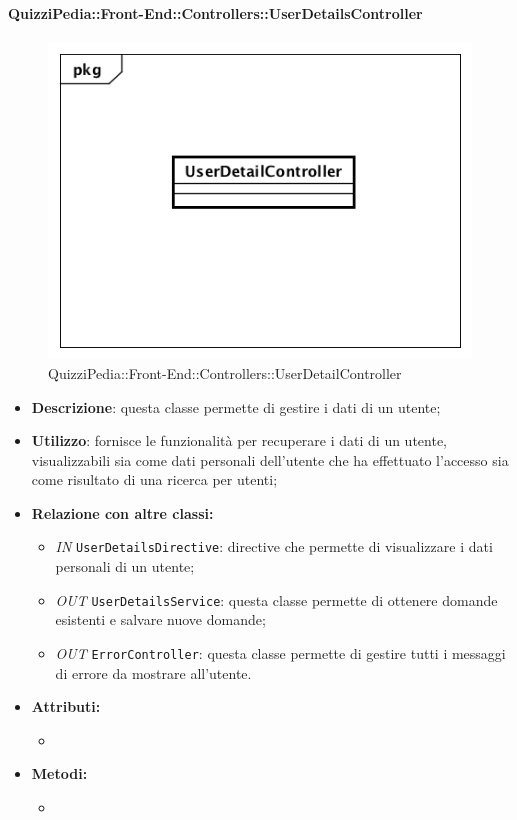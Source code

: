 \paragraph{QuizziPedia::Front-End::Controllers::UserDetailsController}
\begin{figure}
	\centering
	\includegraphics[scale=0.45]{UML/Classi/Front-End/QuizziPedia_Front-end_Controller_UserDetailController.png}
	\caption{QuizziPedia::Front-End::Controllers::UserDetailController}
\end{figure}
\begin{itemize}
	\item \textbf{Descrizione}: questa classe permette di gestire i dati di un utente;
	\item \textbf{Utilizzo}: fornisce le funzionalità per recuperare i dati di un utente, visualizzabili sia come dati personali dell'utente che ha effettuato l'accesso sia come risultato di una ricerca per utenti;
	\item \textbf{Relazione con altre classi:}
	\begin{itemize}
		\item \textit{IN} \texttt{UserDetailsDirective}: directive che permette di visualizzare i dati personali di un utente;
		\item \textit{OUT} \texttt{UserDetailsService}: questa classe permette di ottenere domande esistenti e salvare nuove domande;
		\item \textit{OUT} \texttt{ErrorController}: questa classe permette di gestire tutti i messaggi di errore da mostrare all'utente.

	\end{itemize}
	\item \textbf{Attributi:}
	\begin{itemize}
		\item 
	\end{itemize}
	\item \textbf{Metodi:}
	\begin{itemize}
		\item 
	\end{itemize}
\end{itemize}

